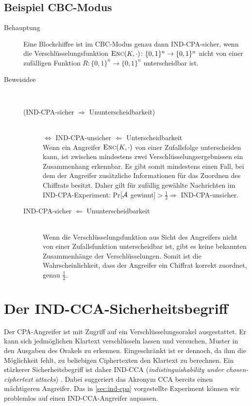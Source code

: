 \subsection{Beispiel CBC-Modus} 
\begin{description}
\item[Behauptung] Eine Blockchiffre ist im CBC-Modus \indexCBC
  genau dann IND-CPA-sicher, wenn die Verschlüsselungsfunktion
  $\textsc{Enc}(K,\cdot) \colon \{0,1\}^n \rightarrow \{0,1\}^n$ nicht von
  einer zufälligen Funktion $R \colon \{0,1\}^n \rightarrow \{0,1\}^n$
  unterscheidbar ist.
\item[Beweisidee]~
  \begin{description}
  \item[(IND-CPA-sicher $\Rightarrow$
    Ununterscheidbarkeit)]~\\ $\Leftrightarrow$ IND-CPA-unsicher
    $\Leftarrow$ Unterscheidbarkeit~\\ Wenn ein Angreifer $\textsc{Enc}(K,
    \cdot)$ von einer Zufallsfolge unterscheiden kann, ist zwischen
    mindestens zwei Verschlüsselungsergebnissen ein Zusammenhang
    erkennbar. Es gibt somit mindestens einen Fall, bei dem der Angreifer
    zusätzliche Informationen für das Zuordnen des Chiffrats besitzt. Daher
    gilt für zufällig gewählte Nachrichten im IND-CPA-Experiment: Pr$[\mathcal{A}$
    gewinnt$] > \frac{1}{2} \Rightarrow$ IND-CPA-unsicher.
  \item[IND-CPA-sicher $\Leftarrow$
    Ununterscheidbarkeit]~\\ Wenn die Verschlüsselungsfunktion aus Sicht des
    Angreifers nicht von einer Zufallsfunktion unterscheidbar ist, gibt es
    keine bekannten Zusammenhänge der Verschlüsselungen. Somit ist die
    Wahrscheinlichkeit, dass der Angreifer ein Chiffrat korrekt zuordnet,
    genau $\frac{1}{2}$.
  \end{description}
\end{description}

\section{Der IND-CCA-Sicherheitsbegriff}\label{sec:ind-cca} Der
CPA-Angreifer ist mit Zugriff auf ein Verschlüsselungsorakel
ausgestattet. Er kann sich jedmöglichen Klartext verschlüsseln lassen
und versuchen, Muster in den Ausgaben des Orakels zu
erkennen. Eingeschränkt ist er dennoch, da ihm die Möglichkeit fehlt, zu
beliebigen Ciphertexten den Klartext zu berechnen. Ein stärkerer
Sicherheitsbegriff ist daher IND-CCA (\emph{indistinguishability under
  chosen-ciphertext attacks}) \indexINDCCA. Dabei suggeriert das Akronym
CCA bereits einen mächtigeren Angreifer. Das in \ref{sec:ind-cpa}
vorgestellte Experiment können wir problemlos auf einen
IND-CCA-Angreifer anpassen.

